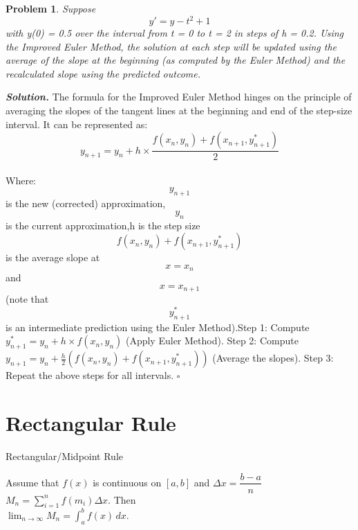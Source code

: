 \documentclass[12pt]{article}
\newtheorem{problem}{Problem}
\newenvironment{solution}[1][\it{Solution}]{\textbf{#1. } }{$\square$}
\begin{document}
\begin{problem}
Suppose \begin{equation}
    y' = y - t^2 + 1
\end{equation} with y(0) = 0.5 over the interval from t = 0 to t = 2
in steps of h = 0.2. Using the Improved Euler Method, the solution at each step will be updated using the average of the slope at the beginning (as computed by the Euler Method) and the recalculated slope using the predicted outcome.
\end{problem}
\begin{solution}
The formula for the Improved Euler Method hinges on the principle of averaging the slopes of the tangent lines at the beginning and end of the step-size interval. It can be represented as: \\ \begin{equation}
    y_{n+1} = y_n + h \times \frac{{f(x_n, y_n) + f(x_{n+1}, y^{*}_{n+1})}}{2}
\end{equation}  \\Where: \begin{equation}
    y_{n+1}
\end{equation} is the new (corrected) approximation,\newline \begin{equation}
    y_n
\end{equation} is the current approximation,\newline h is the step size\newline \begin{equation}
    f(x_n, y_n) + f(x_{n+1}, y^{*}_{n+1})
\end{equation} is the average slope at \begin{equation}
    x = x_n
\end{equation} and \begin{equation}
    x = x_{n+1}
\end{equation} (note that \begin{equation}
    y^{*}_{n+1}
\end{equation} is an intermediate prediction using the Euler Method).\newline Step 1: Compute \( y^{*}_{n+1} = y_{n} + h \times f(x_{n}, y_{n}) \) (Apply Euler Method).
Step 2: Compute \( y_{n+1} = y_{n} + \frac{h}{2} (f(x_{n}, y_{n}) + f(x_{n+1}, y^{*}_{n+1})) \) (Average the slopes).
Step 3: Repeat the above steps for all intervals.
\end{solution}

\section{Rectangular Rule}
\begin{center}
    Rectangular/Midpoint Rule \\
\end{center}
Assume that \(f(x)\) is continuous on \([a,b]\) and \(Δx=\dfrac{b−a}{n}\) \(M_n=\sum_{i=1}^nf(m_i)Δx.\) Then \\ \(\displaystyle \lim_{n→∞}M_n=∫^b_af(x)\,dx.\) 
\end{document}
